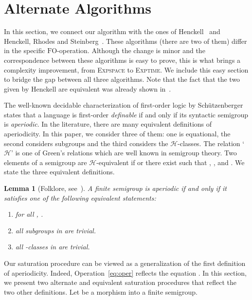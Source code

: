 \documentclass{CSML}
\newcommand{\fo}{\ensuremath{\text{FO}}\xspace}
\newcommand\Hrel{\ensuremath{{\mathscr{H}}}}
\theoremstyle{plain}
\newtheorem{lemma}[thm]{Lemma}
\begin{document}
\section{Alternate Algorithms}
\label{sec:altalgo}
In this section, we connect our algorithm with the ones of
Henckell~\cite{Henckell:Pointlike-sets:-finest-aperiodic:1988:a} and Henckell,
Rhodes and Steinberg~\cite{DBLP:journals/ijac/HenckellRS10a,qt}. These
algorithms (there are two of them) differ in the specific \fo-operation.
Although the change is minor and the correspondence between these algorithms
is easy to prove, this is what brings a complexity improvement, from
\textsc{Expspace} to \textsc{Exptime}. We include this easy section to bridge
the gap between all three algorithms. Note that the fact that the two given by
Henckell are equivalent was already shown
in~\cite{Henckell:Pointlike-sets:-finest-aperiodic:1988:a}.

The well-known decidable characterization of first-order logic by
Schützenberger~\cite{sfo,mnpfo} states that a language is
first-order \emph{definable} if and only if its syntactic semigroup is
\emph{aperiodic}. In the literature, there are many equivalent
definitions of aperiodicity. In this paper, we consider three of them:
one is equational, the second considers subgroups and the third
considers the \Hrel-classes. The relation `\Hrel' is one of Green's
relations which are well known in semigroup theory. Two elements 
of a semigroup  are \Hrel-equivalent if  or there exist  such that , ,  and
. We state the three equivalent definitions.

\begin{lemma}[Folklore, see~\cite{Pin13:MPRI}]
  A finite semigroup  is aperiodic if and only if it satisfies one
  of the following equivalent statements:
  \begin{enumerate}
  \item for all , .
  \item all subgroups in  are trivial.
  \item all -classes in  are trivial.
  \end{enumerate}
\end{lemma}

Our saturation procedure  can be viewed as a generalization of
the first definition of aperiodicity. Indeed,
Operation~\ref{eq:oper} reflects the equation . In this section, we present two alternate and equivalent
saturation procedures that reflect the two other definitions. Let
 be a morphism into a finite semigroup.
\end{document}
